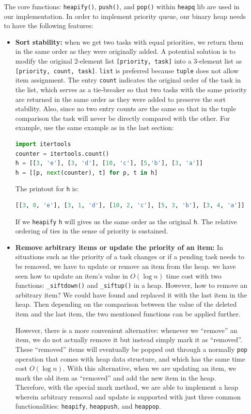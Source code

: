 \documentclass[../main.tex]{subfiles}
\begin{document}
The core functions: \texttt{heapify()}, \texttt{push()}, and \texttt{pop()} within \texttt{heapq} lib are used in our implementation. In order to implement priority queue, our binary heap needs to have the following features:
\begin{itemize}
    \item \textbf{Sort stability:} when we get two tasks with equal priorities, we return them in the same order as they were originally added. A potential solution is to modify the original 2-element list \texttt{[priority, task]} into a 3-element list as \texttt{[priority, count, task]}. \texttt{list} is preferred because \texttt{tuple} does not allow item assignment. The entry \texttt{count} indicates the original order of the task in the list, which serves as a tie-breaker so that two tasks with the same priority are returned in the same order as they were added to preserve the sort stability. Also, since no two entry counts are the same so that in the tuple comparison  the task will never be directly compared with the other. For example, use the same example as in the last section:
\begin{lstlisting}[language=Python]
import itertools
counter = itertools.count()
h = [[3, 'e'], [3, 'd'], [10, 'c'], [5,'b'], [3, 'a']]
h = [[p, next(counter), t] for p, t in h]
\end{lstlisting}
The printout for \texttt{h} is:
\begin{lstlisting}[language=Python]
[[3, 0, 'e'], [3, 1, 'd'], [10, 2, 'c'], [5, 3, 'b'], [3, 4, 'a']]
\end{lstlisting}
If we \texttt{heapify} \texttt{h} will gives us the same order as the original \texttt{h}. The relative ordering of ties in the sense of priority is sustained. 
\item \textbf{Remove arbitrary items or update the priority of an item:} In situations such as the priority of a task changes or if a pending task needs to be removed, we have to update or remove an item from the heap. we have seen how to update an item's value in $O(\log n)$ time cost with two functions: \texttt{\_siftdown()} and \texttt{\_siftup()} in a heap. However, how to remove an arbitrary item? We could have found and replaced it with the last item in the heap. Then depending on the comparison between the value of the deleted item and the last item, the two mentioned functions can be applied further. 

However, there is a more convenient alternative: whenever we ``remove'' an item, we do not actually remove it but instead simply mark it as ``removed''. These ``removed'' items will eventually be popped out through a normally \texttt{pop} operation that comes with heap data structure, and which has the same time cost $O(\log n)$. With this alternative, when we are updating an item, we mark the old item as ``removed'' and add the new item in the heap. Therefore, with the special mark method, we are able to implement a heap wherein arbitrary removal and update is supported with just three common functionalities: \texttt{heapify}, \texttt{heappush}, and \texttt{heappop}. 


\end{itemize}
\end{document}
